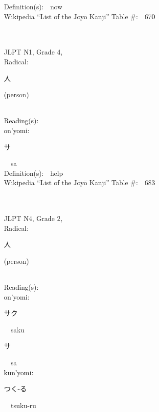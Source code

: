\begin{multicols}{2}
Definition(s):\ \ now \\
Wikipedia ``List of the J\=oy\=o Kanji'' Table \#:\ \ 670 \\
\ \ \\
{\fontsize{34pt}{40pt}  }\ \ \\  %
{JLPT N1, Grade 4, \\Radical:\ \ {\begin{CJK}{UTF8}{min} 人 \end{CJK}} (person) } \\
Reading(s):\ \ \\
{\hspace*{1em}}on'yomi:\ \ \\
{\hspace*{2em}}{\begin{CJK}{UTF8}{min} サ \end{CJK}}\ \ sa\ \ \\
Definition(s):\ \ help \\
Wikipedia ``List of the J\=oy\=o Kanji'' Table \#:\ \ 683 \\
\ \ \\
{\fontsize{34pt}{40pt}  }\ \ \\  %
{JLPT N4, Grade 2, \\Radical:\ \ {\begin{CJK}{UTF8}{min} 人 \end{CJK}} (person) } \\
Reading(s):\ \ \\
{\hspace*{1em}}on'yomi:\ \ \\
{\hspace*{2em}}{\begin{CJK}{UTF8}{min} サク \end{CJK}}\ \ saku\ \ \\
{\hspace*{2em}}{\begin{CJK}{UTF8}{min} サ \end{CJK}}\ \ sa\ \ \\
{\hspace*{1em}}kun'yomi:\ \ \\
{\hspace*{2em}}{\begin{CJK}{UTF8}{min} つく-る \end{CJK}}\ \ tsuku-ru\ \ \\

\end{multicols}
